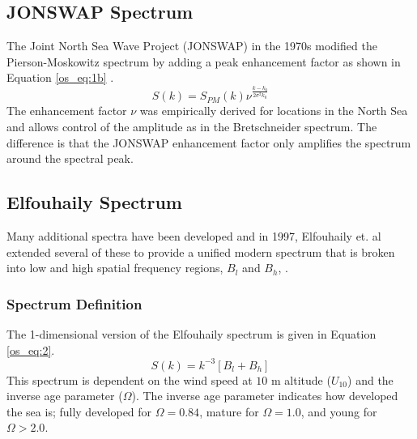 \subsection{JONSWAP Spectrum}
The Joint North Sea Wave Project (JONSWAP) in the 1970s modified the Pierson-Moskowitz spectrum by adding a peak enhancement factor as shown in Equation \ref{os_eq:1b} \cite{michel_sea_spectra}.
\begin{equation}
  \label{os_eq:1b}
  S(k) = S_{PM}(k)\nu^{\frac{k-k_0}{2\sigma^2k_0}} 
  \end{equation}
The enhancement factor $\nu$ was empirically derived for locations in the North Sea and allows control of the amplitude as in the Bretschneider spectrum. The difference is that the JONSWAP enhancement factor only amplifies the spectrum around the spectral peak.

\subsection{Elfouhaily Spectrum}
Many additional spectra have been developed and in 1997, Elfouhaily et. al extended several of these to provide a unified modern spectrum that is broken into low and high spatial frequency regions, $B_l$ and $B_h$, \cite{elfouhaily}. 

\subsubsection{Spectrum Definition}
The 1-dimensional version of the Elfouhaily spectrum is given in Equation \ref{os_eq:2}.
\begin{equation}
  \label{os_eq:2}
  S(k) = k^{-3}\left[B_l + B_h \right]
\end{equation}
\renewcommand{\baselinestretch}{2} \small\normalsize
This spectrum is dependent on the wind speed at $10$ m altitude ($U_{10}$) and the inverse age parameter ($\Omega$). The inverse age parameter indicates how developed the sea is; fully developed for $\Omega = 0.84$, mature for $\Omega = 1.0$, and young for $\Omega > 2.0$. 


